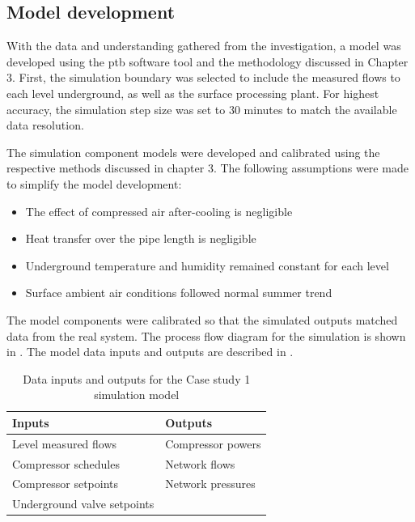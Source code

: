 \subsection{Model development}
With the data and understanding gathered from the investigation, a model was developed using the \gls{ptb} software tool and the methodology discussed in Chapter 3. First, the simulation boundary was selected to include the measured flows to each level underground, as well as the surface processing plant. For highest accuracy, the simulation step size was set to 30 minutes to match the available data resolution.
\par
The simulation component models were developed and calibrated using the respective methods discussed in chapter 3. The following assumptions were made to simplify the model development:
\begin{itemize}
	\item The effect of compressed air after-cooling is negligible
	\item Heat transfer over the pipe length is negligible
	\item Underground temperature and humidity remained constant for each level
	\item Surface ambient air conditions followed normal summer trend
\end{itemize} 
The model components were calibrated so that the simulated outputs matched data from the real system. The process flow diagram for the simulation is shown in . The model data inputs and outputs are described in .

\begin{table}[h!]
	\centering
	\begin{tabular}{ll}
		\hline
		Inputs \hspace*{4cm} &Outputs \hspace*{4cm} \\ \hline
		Level measured flows&Compressor powers \\
		Compressor schedules& Network flows \\
		Compressor setpoints& Network pressures \\
		Underground valve setpoints& \\
		\hline
	\end{tabular}
	\caption{Data inputs and outputs for the Case study 1 simulation model }
	\label{table: Mine A inputs/outputs}
\end{table}


